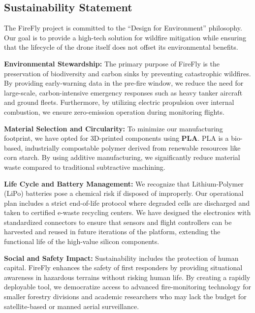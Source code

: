 \documentclass[journal, onecolumn]{IEEEtran}
\begin{document}
\subsection{Sustainability Statement}

The FireFly project is committed to the ``Design for Environment'' philosophy. Our goal is to provide a high-tech solution for wildfire mitigation while ensuring that the lifecycle of the drone itself does not offset its environmental benefits.

\vspace{1em}

\textbf{Environmental Stewardship:}
The primary purpose of FireFly is the preservation of biodiversity and carbon sinks by preventing catastrophic wildfires. By providing early-warning data in the pre-fire window, we reduce the need for large-scale, carbon-intensive emergency responses such as heavy tanker aircraft and ground fleets. Furthermore, by utilizing electric propulsion over internal combustion, we ensure zero-emission operation during monitoring flights.

\vspace{1em}

\textbf{Material Selection and Circularity:}
To minimize our manufacturing footprint, we have opted for 3D-printed components using \textbf{PLA}. PLA is a bio-based, industrially compostable polymer derived from renewable resources like corn starch. By using additive manufacturing, we significantly reduce material waste compared to traditional subtractive machining.

\vspace{1em}

\textbf{Life Cycle and Battery Management:}
We recognize that Lithium-Polymer (LiPo) batteries pose a chemical risk if disposed of improperly. Our operational plan includes a strict end-of-life protocol where degraded cells are discharged and taken to certified e-waste recycling centers. We have designed the electronics with standardized connectors to ensure that sensors and flight controllers can be harvested and reused in future iterations of the platform, extending the functional life of the high-value silicon components.

\vspace{1em}

\textbf{Social and Safety Impact:}
Sustainability includes the protection of human capital. FireFly enhances the safety of first responders by providing situational awareness in hazardous terrains without risking human life. By creating a rapidly deployable tool, we democratize access to advanced fire-monitoring technology for smaller forestry divisions and academic researchers who may lack the budget for satellite-based or manned aerial surveillance.
\end{document}
